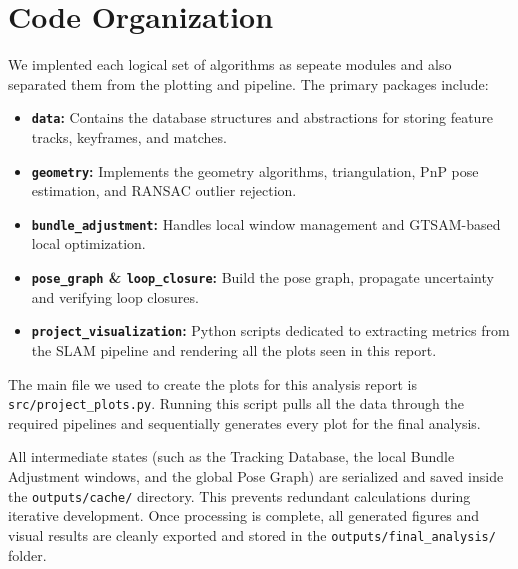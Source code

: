 \documentclass[12pt]{article}
\begin{document}
\section{Code Organization}
\label{sec:code}

We implented each logical set of algorithms as sepeate modules and also separated them from the plotting and pipeline. The primary packages include:
\begin{itemize}
    \item \textbf{\texttt{data}:} Contains the database structures and abstractions for storing feature tracks, keyframes, and matches.
    \item \textbf{\texttt{geometry}:} Implements the geometry algorithms, triangulation, PnP pose estimation, and RANSAC outlier rejection.
    \item \textbf{\texttt{bundle\_adjustment}:} Handles local window management and GTSAM-based local optimization.
    \item \textbf{\texttt{pose\_graph} \& \texttt{loop\_closure}:} Build the pose graph, propagate uncertainty and verifying loop closures.
    \item \textbf{\texttt{project\_visualization}:} Python scripts dedicated to extracting metrics from the SLAM pipeline and rendering all the plots seen in this report.
\end{itemize}

The main file we used to create the plots for this analysis report is \texttt{src/project\_plots.py}. Running this script pulls all the data through the required pipelines and sequentially generates every plot for the final analysis.

All intermediate states (such as the Tracking Database, the local Bundle Adjustment windows, and the global Pose Graph) are serialized and saved inside the \texttt{outputs/cache/} directory. This prevents redundant calculations during iterative development. Once processing is complete, all generated figures and visual results are cleanly exported and stored in the \texttt{outputs/final\_analysis/} folder.
\end{document}
